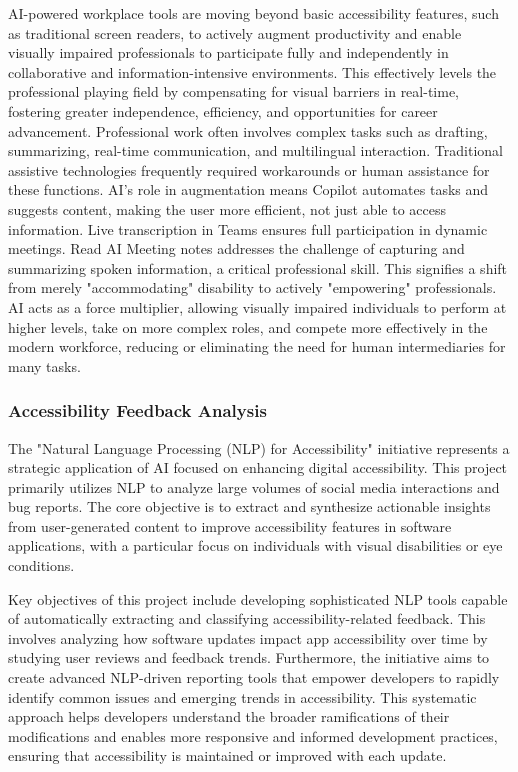 AI-powered workplace tools are moving beyond basic accessibility features, such as traditional screen readers, to actively augment productivity and enable visually impaired professionals to participate fully and independently in collaborative and information-intensive environments. This effectively levels the professional playing field by compensating for visual barriers in real-time, fostering greater independence, efficiency, and opportunities for career advancement. Professional work often involves complex tasks such as drafting, summarizing, real-time communication, and multilingual interaction. Traditional assistive technologies frequently required workarounds or human assistance for these functions. AI's role in augmentation means Copilot automates tasks and suggests content, making the user more efficient, not just able to access information. Live transcription in Teams ensures full participation in dynamic meetings. Read AI Meeting notes \cite{accessiblepharmacy2024} addresses the challenge of capturing and summarizing spoken information, a critical professional skill. This signifies a shift from merely "accommodating" disability to actively "empowering" professionals. AI acts as a force multiplier, allowing visually impaired individuals to perform at higher levels, take on more complex roles, and compete more effectively in the modern workforce, reducing or eliminating the need for human intermediaries for many tasks.

\subsubsection{Accessibility Feedback Analysis}

The "Natural Language Processing (NLP) for Accessibility" initiative represents a strategic application of AI focused on enhancing digital accessibility. This project primarily utilizes NLP to analyze large volumes of social media interactions and bug reports. The core objective is to extract and synthesize actionable insights from user-generated content to improve accessibility features in software applications, with a particular focus on individuals with visual disabilities or eye conditions. \cite{wajdialjedaani2024}

Key objectives of this project include developing sophisticated NLP tools capable of automatically extracting and classifying accessibility-related feedback. This involves analyzing how software updates impact app accessibility over time by studying user reviews and feedback trends. Furthermore, the initiative aims to create advanced NLP-driven reporting tools that empower developers to rapidly identify common issues and emerging trends in accessibility. This systematic approach helps developers understand the broader ramifications of their modifications and enables more responsive and informed development practices, ensuring that accessibility is maintained or improved with each update. \cite{wajdialjedaani2024}

